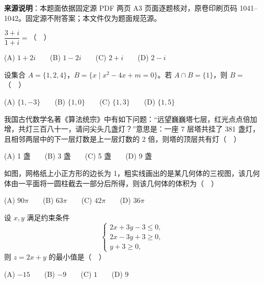 


\begin{gktip}
\textbf{来源说明}：本题面依据固定源 PDF 两页 A3 页面逐题核对，原卷印刷页码 1041–1042。固定源不附答案；本文件仅为题面规范源。
\end{gktip}


\begin{question}
\(\dfrac{3+i}{1+i}=\)（　）

   (A) \(1+2i\)　　(B) \(1-2i\)　　(C) \(2+i\)　　(D) \(2-i\)

\end{question}
\begin{question}
设集合 \(A=\{1,2,4\}\)，\(B=\{x\mid x^2-4x+m=0\}\)。若 \(A\cap B=\{1\}\)，则 \(B=\)（　）

   (A) \(\{1,-3\}\)　　(B) \(\{1,0\}\)　　(C) \(\{1,3\}\)　　(D) \(\{1,5\}\)

\end{question}
\begin{question}
我国古代数学名著《算法统宗》中有如下问题：“远望巍巍塔七层，红光点点倍加增，共灯三百八十一，请问尖头几盏灯？”意思是：一座 7 层塔共挂了 381 盏灯，且相邻两层中的下一层灯数是上一层灯数的 2 倍，则塔的顶层共有灯（　）

   (A) 1 盏　　(B) 3 盏　　(C) 5 盏　　(D) 9 盏

\Needspace{0.4\textheight}
\end{question}
\begin{question}
如图，网格纸上小正方形的边长为 1，粗实线画出的是某几何体的三视图，该几何体由一平面将一圆柱截去一部分后所得，则该几何体的体积为（　）
\nopagebreak[4]
\begin{center}\end{center}
\nopagebreak[4]
   (A) \(90\pi\)　　(B) \(63\pi\)　　(C) \(42\pi\)　　(D) \(36\pi\)

\end{question}
\begin{question}
设 \(x,y\) 满足约束条件
\nopagebreak[4]
   \[
   \begin{cases}
   2x+3y-3\leq 0,\\
   2x-3y+3\geq 0,\\
   y+3\geq 0,
   \end{cases}
   \]
   则 \(z=2x+y\) 的最小值是（　）

   (A) \(-15\)　　(B) \(-9\)　　(C) \(1\)　　(D) \(9\)

\end{question}
